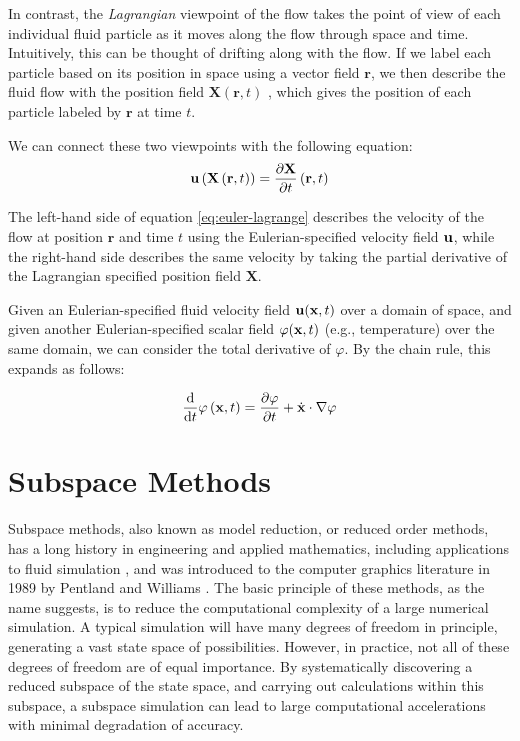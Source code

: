 In contrast, the {\em Lagrangian} viewpoint of the flow takes the point of view of each individual fluid particle as it moves along the flow through space and time. Intuitively, this can be thought of drifting along with the flow. If we label each particle based on its position in space using a vector field $\mathbf{r}$, we then describe the fluid flow with the position field $\mathbf{X}(\mathbf{r}, t)$ , which gives the position of each particle labeled by $\mathbf{r}$ at time $t$.

We can connect these two viewpoints with the following equation:
\begin{equation}
\label{eq:euler-lagrange}
\mathbf{u}\left(\mathbf{X}\left(\mathbf{r}, t\right)\right) = \frac{\partial \mathbf{X}}{\partial t}\left(\mathbf{r}, t\right)
\end{equation}

The left-hand side of equation \ref{eq:euler-lagrange} describes the velocity of the flow at position $\mathbf{r}$ and time $t$ using the Eulerian-specified velocity field $\mathbf{u}$, while the right-hand side describes the same velocity by taking the partial derivative of the Lagrangian specified position field $\mathbf{X}$.

Given an Eulerian-specified fluid velocity field $\mathbf{u}(\mathbf{x}, t)$ over a domain of space, and given another Eulerian-specified scalar field $\varphi(\mathbf{x}, t)$ (e.g., temperature) over the same domain, we can consider the total derivative of $\varphi$. By the chain rule, this expands as follows:

\begin{equation}
\frac{\mathrm{d}}{\mathrm{d}t}\varphi\left(\mathbf{x}, t\right) = \frac{\partial \varphi}{\partial t} + \dot{\mathbf{x}} \cdot \nabla \varphi
\end{equation}

\section{Subspace Methods}
Subspace methods, also known as model reduction, or reduced order methods, has a long history in engineering and applied mathematics, including applications to fluid simulation \cite{lumley1967}, and was introduced to the computer graphics literature in 1989 by Pentland and Williams \cite{Pentland:1989:GVM, Berkooz93theproper}. The basic principle of these methods, as the name suggests, is to reduce the computational complexity of a large numerical simulation. A typical simulation will have many degrees of freedom in principle, generating a vast state space of possibilities. However, in practice, not all of these degrees of freedom are of equal importance. By systematically discovering a reduced subspace of the state space, and carrying out calculations within this subspace, a subspace simulation can lead to large computational accelerations with minimal degradation of accuracy.

